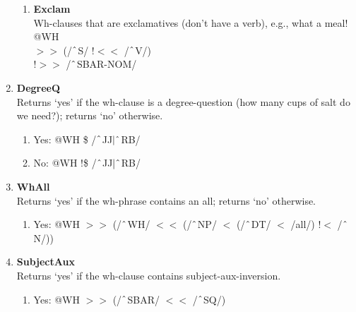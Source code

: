 \begin{enumerate}
\begin{enumerate}
            \item \textbf{Exclam} \\
            Wh-clauses that are exclamatives (don't have a verb), e.g., \textsf{what a meal!}
            @WH\\ 
            $>\!\!>$ (/$\string^$S/ !$<\!\!<$ /$\string^$V/) \\
            !$>\!\!>$ /$\string^$SBAR-NOM/
        \end{enumerate}
    \item \textbf{DegreeQ}\\
    Returns `yes' if the wh-clause is a degree-question (\textsf{how many cups of salt do we need?}); returns `no' otherwise.
        \begin{enumerate}
            \item Yes: @WH \$ /$\string^$JJ$|\string^$RB/
            \item No: @WH !\$ /$\string^$JJ$|\string^$RB/
        \end{enumerate}
    \item \textbf{WhAll}\\
    Returns `yes' if the wh-phrase contains an \textsf{all}; returns `no' otherwise.
        \begin{enumerate}
            \item Yes: @WH $>\!\!>$ (/$\string^$WH/ $<\!\!<$ (/$\string^$NP/ $<$ (/$\string^$DT/ $<$ /all/) !$<$ /$\string^$N/))
        \end{enumerate}
    \item \textbf{SubjectAux}\\
    Returns `yes' if the wh-clause contains subject-aux-inversion.
        \begin{enumerate}
            \item Yes: @WH $>\!\!>$ (/$\string^$SBAR/ $<\!\!<$ /$\string^$SQ/)
        \end{enumerate}
    
\end{enumerate}

